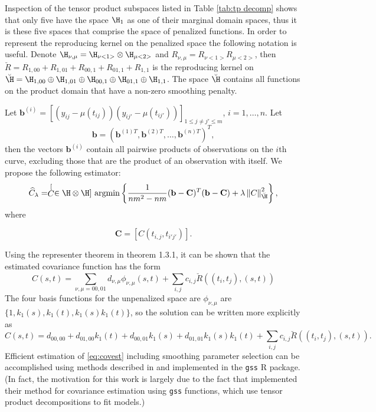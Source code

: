Inspection of the tensor product subspaces listed in Table \ref{tab:tp decomp} shows that only five have the space $\H_1$ as one of their marginal domain spaces, thus it is these five spaces that comprise the space of penalized functions. In order to represent the reproducing kernel on the penalized space the following notation is useful. Denote $\H_{\nu, \mu}=\H_{\nu <1>}\otimes \H_{\mu <2>}$ and $R_{\nu, \mu}=R_{\nu <1>}R_{\mu <2>}$, then $\breve{R} = R_{1,00}+R_{1,01}+R_{00,1}+R_{01,1}+R_{1,1}$ is the reproducing kernel on $\breve{\H} = \H_{1,00}\oplus\H_{1,01}\oplus\H_{00,1}\oplus\H_{01,1}\oplus\H_{1,1}$. The space $\breve{\H}$ contains all functions on the product domain that have a non-zero smoothing penalty.

Let $\mathbf{b}^{(i)} = [(y_{ij}-\mu(t_{ij}))(y_{ij'}-\mu(t_{ij'}))]_{1\leq j\neq j'\leq m}$, $i=1, \dots, n$. Let
\[ \mathbf{b} = (\mathbf{b}^{(1)T}, \mathbf{b}^{(2)T}, \dots, \mathbf{b}^{(n)T} )^T, \]
then the vectors $\mathbf{b}^{(i)}$ contain all pairwise products of observations on the $i$th curve, excluding those that are the product of an observation with itself. We propose the following estimator:
\[ \widehat{C}_{\lambda}=\stackrel[C \in \H\otimes \H]{}{\text{ argmin}} \left\{\frac{1}{nm^2-nm} (\mathbf{b} - \mathbf{C})^T(\mathbf{b} - \mathbf{C})+\lambda\left\Vert C\right\Vert _{\breve{\H}}^{2} \right\}, \]
where

\[ \mathbf{C} = [C(t_{i,j}, t_{i'j'})]. \]

Using the representer theorem in \cite{Wahba:1990} theorem 1.3.1, it can be shown that the estimated covariance function has the form 
\begin{equation}
	\hat{C}(s,t) = \sum_{\nu, \mu=00,01}d_{\nu,\mu}\phi_{\nu,\mu}(s,t) + \sum_{i,j}c_{i,j}\breve{R}((t_i,t_j),(s,t))
	
\end{equation}
The four basis functions for the unpenalized space are $\phi_{\nu,\mu}$ are $\{ 1, k_1(s), k_1(t), k_1(s)k_1(t) \}$, so the solution can be written more explicitly as 
\begin{equation}
	\hat{C}(s,t) = d_{00,00} + d_{01,00}k_1(t) + d_{00,01}k_1(s) + d_{01,01}k_1(s)k_1(t) + \sum_{i,j}c_{i,j}\breve{R}((t_i,t_j),(s,t)). \label{eq:covest} 
\end{equation}
Efficient estimation of \eqref{eq:covest} including smoothing parameter selection can be accomplished using methods described in \cite{Gu2002} and implemented in the \texttt{gss} R package. (In fact, the motivation for this work is largely due to the fact that \cite{Cai:2010vr} implemented their method for covariance estimation using \texttt{gss} functions, which use tensor product decompositions to fit models.)

